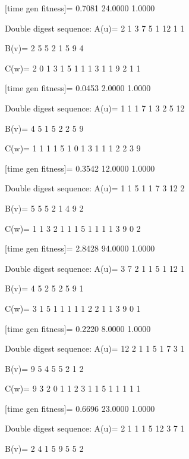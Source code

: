 [time gen fitness]=
    0.7081   24.0000    1.0000

Double digest sequence:
A(u)=
     2     1     3     7     5     1    12     1     1

B(v)=
     2     5     5     2     1     5     9     4

C(w)=
     2     0     1     3     1     5     1     1     1     3     1     1     9     2     1     1

[time gen fitness]=
    0.0453    2.0000    1.0000

Double digest sequence:
A(u)=
     1     1     1     7     1     3     2     5    12

B(v)=
     4     5     1     5     2     2     5     9

C(w)=
     1     1     1     1     5     1     0     1     3     1     1     1     2     2     3     9

[time gen fitness]=
    0.3542   12.0000    1.0000

Double digest sequence:
A(u)=
     1     1     5     1     1     7     3    12     2

B(v)=
     5     5     5     2     1     4     9     2

C(w)=
     1     1     3     2     1     1     1     5     1     1     1     1     3     9     0     2

[time gen fitness]=
    2.8428   94.0000    1.0000

Double digest sequence:
A(u)=
     3     7     2     1     1     5     1    12     1

B(v)=
     4     5     2     5     2     5     9     1

C(w)=
     3     1     5     1     1     1     1     1     2     2     1     1     3     9     0     1

[time gen fitness]=
    0.2220    8.0000    1.0000

Double digest sequence:
A(u)=
    12     2     1     1     5     1     7     3     1

B(v)=
     9     5     4     5     5     2     1     2

C(w)=
     9     3     2     0     1     1     2     3     1     1     5     1     1     1     1     1

[time gen fitness]=
    0.6696   23.0000    1.0000

Double digest sequence:
A(u)=
     2     1     1     1     5    12     3     7     1

B(v)=
     2     4     1     5     9     5     5     2

